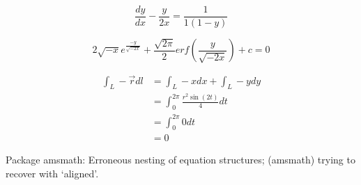 \documentclass[UTF8]{article}
\begin{document}
\begin{equation}
    \frac{dy}{dx}-\frac{y}{2x}=\frac{1}{1(1-y)}
\end{equation}
     
\begin{equation}
    2\sqrt{-x}e^{\frac{-y}{\sqrt{-2x}}}+
    \frac{\sqrt{2\pi}}{2}erf \left( \frac{y}{\sqrt{-2x}} \right)+c=0
\end{equation}




\begin{align}%
\label{1}    
    \int _L - \vec r dl &=\int _L - x dx+\int _L -  y dy \\
    &=\int _0 ^{2\pi} \frac {r^2 \sin (2t)}{4} dt\\
    &=\int _0 ^{2\pi} 0 dt \\
   &=0
\end{align}
 
 

Package amsmath: Erroneous nesting of equation structures;
(amsmath)	trying to recover with `aligned'.
\end{document}
